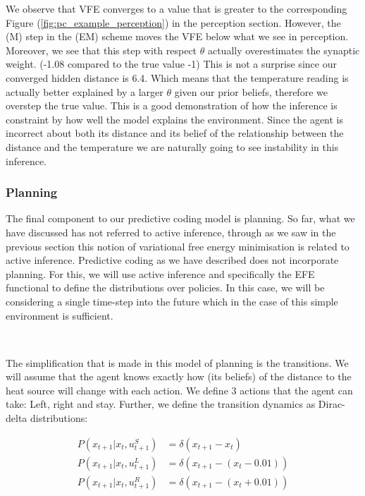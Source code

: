 \documentclass{article}
\newcommand{\refp}[1]{(\ref{#1})}
\begin{document}
We observe that VFE converges to a value that is greater to the corresponding Figure \refp{fig:pc_example_perception} in the perception section. However, the (M) step in the (EM) scheme moves the VFE below what we see in perception. Moreover, we see that this step with respect $\theta$ actually overestimates the synaptic weight. (-1.08 compared to the true value -1) This is not a surprise since our converged hidden distance is 6.4. Which means that the temperature reading is actually better explained by a larger $\theta$ given our prior beliefs, therefore we overstep the true value. This is a good demonstration of how the inference is constraint by how well the model explains the environment. Since the agent is incorrect about both its distance and its belief of the relationship between the distance and the temperature we are naturally going to see instability in this inference.

\subsubsection{Planning}

The final component to our predictive coding model is planning. So far, what we have discussed has not referred to active inference, through as we saw in the previous section this notion of variational free energy minimisation is related to active inference. Predictive coding as we have described does not incorporate planning. For this, we will use active inference and specifically the EFE functional to define the distributions over policies. In this case, we will be considering a single time-step into the future which in the case of this simple environment is sufficient. 

\

The simplification that is made in this model of planning is the transitions. We will assume that the agent knows exactly how (its beliefs) of the distance to the heat source will change with each action. We define 3 actions that the agent can take: Left, right and stay. Further, we define the transition dynamics as Dirac-delta distributions:

\begin{equation}
\begin{aligned}
	P(x_{t+1} | x_t, u^S_{t+1}) &= \delta(x_{t+1} - x_t ) \\
	P(x_{t+1} | x_t, u^L_{t+1}) &= \delta(x_{t+1} - ( x_t - 0.01) ) \\
	P(x_{t+1} | x_t, u^R_{t+1}) &= \delta(x_{t+1} - ( x_t + 0.01) ) 
\end{aligned}
\end{equation}
\end{document}
